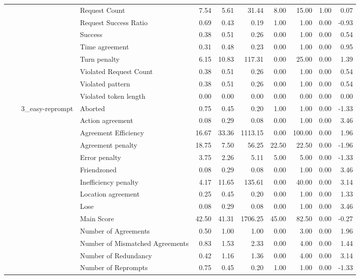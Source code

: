 \begin{tabular}{llllrrrrrrr}
 &  &  & Request Count & 7.54 & 5.61 & 31.44 & 8.00 & 15.00 & 1.00 & 0.07 \\
 &  &  & Request Success Ratio & 0.69 & 0.43 & 0.19 & 1.00 & 1.00 & 0.00 & -0.93 \\
 &  &  & Success & 0.38 & 0.51 & 0.26 & 0.00 & 1.00 & 0.00 & 0.54 \\
 &  &  & Time agreement & 0.31 & 0.48 & 0.23 & 0.00 & 1.00 & 0.00 & 0.95 \\
 &  &  & Turn penalty & 6.15 & 10.83 & 117.31 & 0.00 & 25.00 & 0.00 & 1.39 \\
 &  &  & Violated Request Count & 0.38 & 0.51 & 0.26 & 0.00 & 1.00 & 0.00 & 0.54 \\
 &  &  & Violated pattern & 0.38 & 0.51 & 0.26 & 0.00 & 1.00 & 0.00 & 0.54 \\
 &  &  & Violated token length & 0.00 & 0.00 & 0.00 & 0.00 & 0.00 & 0.00 & 0.00 \\
\cline{3-11}
 &  & \multirow[t]{27}{*}{3_easy-reprompt} & Aborted & 0.75 & 0.45 & 0.20 & 1.00 & 1.00 & 0.00 & -1.33 \\
 &  &  & Action agreement & 0.08 & 0.29 & 0.08 & 0.00 & 1.00 & 0.00 & 3.46 \\
 &  &  & Agreement Efficiency & 16.67 & 33.36 & 1113.15 & 0.00 & 100.00 & 0.00 & 1.96 \\
 &  &  & Agreement penalty & 18.75 & 7.50 & 56.25 & 22.50 & 22.50 & 0.00 & -1.96 \\
 &  &  & Error penalty & 3.75 & 2.26 & 5.11 & 5.00 & 5.00 & 0.00 & -1.33 \\
 &  &  & Friendzoned & 0.08 & 0.29 & 0.08 & 0.00 & 1.00 & 0.00 & 3.46 \\
 &  &  & Inefficiency penalty & 4.17 & 11.65 & 135.61 & 0.00 & 40.00 & 0.00 & 3.14 \\
 &  &  & Location agreement & 0.25 & 0.45 & 0.20 & 0.00 & 1.00 & 0.00 & 1.33 \\
 &  &  & Lose & 0.08 & 0.29 & 0.08 & 0.00 & 1.00 & 0.00 & 3.46 \\
 &  &  & Main Score & 42.50 & 41.31 & 1706.25 & 45.00 & 82.50 & 0.00 & -0.27 \\
 &  &  & Number of Agreements & 0.50 & 1.00 & 1.00 & 0.00 & 3.00 & 0.00 & 1.96 \\
 &  &  & Number of Mismatched Agreements & 0.83 & 1.53 & 2.33 & 0.00 & 4.00 & 0.00 & 1.44 \\
 &  &  & Number of Redundancy & 0.42 & 1.16 & 1.36 & 0.00 & 4.00 & 0.00 & 3.14 \\
 &  &  & Number of Reprompts & 0.75 & 0.45 & 0.20 & 1.00 & 1.00 & 0.00 & -1.33 \\

\end{tabular}

